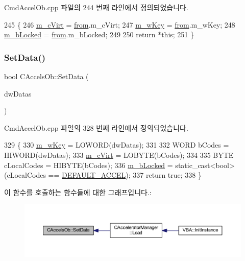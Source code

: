 Cmd\+Accel\+Ob.\+cpp 파일의 244 번째 라인에서 정의되었습니다.


\begin{DoxyCode}
245 \{
246   \mbox{\hyperlink{class_c_accels_ob_a08b7003ccf92c6afcf31878960d8eee1}{m\_cVirt}} = \mbox{\hyperlink{expr_8cpp_a765533dfc643627999c751f7e1514664}{from}}.m\_cVirt;
247   \mbox{\hyperlink{class_c_accels_ob_a1891250e9a4d00c0862f3a90a965d635}{m\_wKey}} = \mbox{\hyperlink{expr_8cpp_a765533dfc643627999c751f7e1514664}{from}}.m\_wKey;
248   \mbox{\hyperlink{class_c_accels_ob_ad8300bd20bd429ad61f89700e388dd9a}{m\_bLocked}} = \mbox{\hyperlink{expr_8cpp_a765533dfc643627999c751f7e1514664}{from}}.m\_bLocked;
249   
250   \textcolor{keywordflow}{return} *\textcolor{keyword}{this};
251 \}
\end{DoxyCode}
\mbox{\label{class_c_accels_ob_a47a1e7e047807b7a36553aa351768096}} 
\subsubsection{\texorpdfstring{Set\+Data()}{SetData()}}
{\footnotesize\ttfamily bool C\+Accels\+Ob\+::\+Set\+Data (\begin{DoxyParamCaption}\item[{D\+W\+O\+RD}]{dw\+Datas }\end{DoxyParamCaption})}



Cmd\+Accel\+Ob.\+cpp 파일의 328 번째 라인에서 정의되었습니다.


\begin{DoxyCode}
329 \{
330   \mbox{\hyperlink{class_c_accels_ob_a1891250e9a4d00c0862f3a90a965d635}{m\_wKey}} = LOWORD(dwDatas);
331   
332   WORD bCodes = HIWORD(dwDatas);
333   \mbox{\hyperlink{class_c_accels_ob_a08b7003ccf92c6afcf31878960d8eee1}{m\_cVirt}} = LOBYTE(bCodes);
334   
335   BYTE cLocalCodes = HIBYTE(bCodes);
336   \mbox{\hyperlink{class_c_accels_ob_ad8300bd20bd429ad61f89700e388dd9a}{m\_bLocked}} = \textcolor{keyword}{static\_cast<}\textcolor{keywordtype}{bool}\textcolor{keyword}{>}(cLocalCodes == \mbox{\hyperlink{_cmd_accel_ob_8cpp_a34bbba669e2c198ae9348cdd388335b9}{DEFAULT\_ACCEL}});
337   \textcolor{keywordflow}{return} \textcolor{keyword}{true};
338 \}
\end{DoxyCode}
이 함수를 호출하는 함수들에 대한 그래프입니다.\+:
\nopagebreak
\begin{figure}[H]
\begin{center}
\leavevmode
\includegraphics[width=350pt]{class_c_accels_ob_a47a1e7e047807b7a36553aa351768096_icgraph}
\end{center}
\end{figure}


